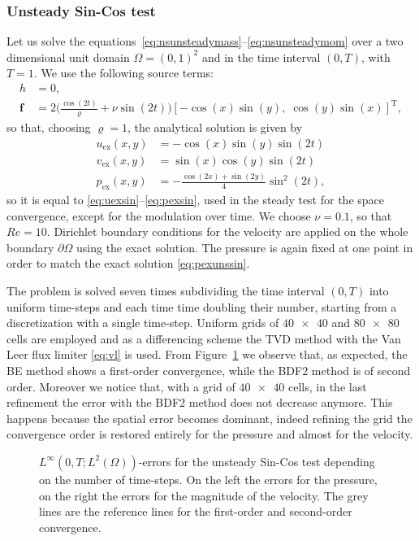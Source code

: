 \subsubsection{Unsteady Sin-Cos test}
Let us solve the equations~\eqref{eq:nsunsteadymass}--\eqref{eq:nsunsteadymom} 
over a two dimensional unit domain $\Omega=(0,1)^2$ and in the time interval 
$(0,T)$, with $T=1$. We use the following source terms:
\begin{align}
h &= 0,\\
\mathbf{f} &= 2\Big(\frac{\cos(2t)}{\varrho} + \nu \sin(2t)\Big)[- \cos(x) 
\sin(y), \; 
\cos(y) \sin(x)]^\mathrm{T},
\end{align}
so that, choosing $\varrho=1$, the analytical solution is given by
\begin{align}
\label{eq:uexunssin}	u_\text{ex}(x,y) &= -\cos(x)\sin(y)\sin(2t)\\
v_\text{ex}(x,y) &= \sin(x)\cos(y)\sin(2t)\\
\label{eq:pexunssin}	p_\text{ex}(x,y) &= 
-\frac{\cos(2x)+\sin(2y)}{4}\sin^2(2t),
\end{align}
so it is equal to \eqref{eq:uexsin}--\eqref{eq:pexsin}, used in the steady test 
for the space convergence, except for the modulation over time. We choose 
$\nu=0.1$, so that $Re=10$. Dirichlet boundary conditions for the velocity are 
applied on the whole boundary $\partial \Omega$ using the exact solution. 
The pressure is again fixed  at one point in order to match the exact solution 
\eqref{eq:pexunssin}.

The problem is solved seven times subdividing the time interval $(0,T)$ into 
uniform time-steps and each time time doubling their number, starting from a discretization with a
single time-step. Uniform grids of $\num{40x40}$ and $\num{80x80}$ cells are 
employed and as a differencing scheme the TVD method with the Van Leer flux 
limiter \eqref{eq:vl} is used. From Figure~\ref{fig:timeerr} we observe that, 
as expected, the BE method shows a first-order convergence, while the BDF2 
method is of second order. Moreover we notice that, with a grid of 
$\num{40x40}$ cells, in the last refinement the error with the BDF2 method does 
not decrease anymore. This happens because the spatial error becomes 
dominant, indeed refining the grid the convergence order is restored entirely 
for the pressure and almost for the velocity.
\begin{figure}
	\centering
	\subfloat{}
	\subfloat{}
	\caption[$L^\infty(0,T;L^2(\Omega))$-errors for the unsteady Sin-Cos 
	test]{$L^\infty(0,T;L^2(\Omega))$-errors for the unsteady Sin-Cos test 
	depending on the number of time-steps. On the left the errors for the 
	pressure, on the right the errors for the magnitude of the velocity. The 
	grey lines are the reference lines for the first-order and second-order 
	convergence.}
	\label{fig:timeerr}
\end{figure}
%
